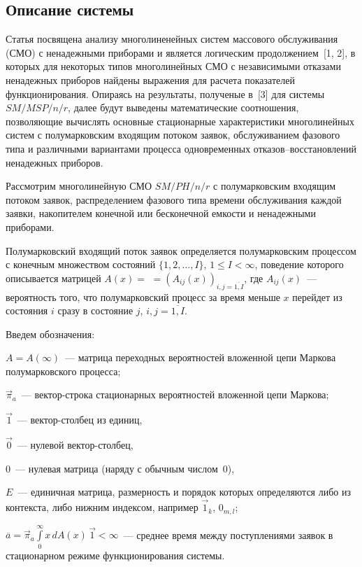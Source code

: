 \begin{multicols}{2}

\section{Описание системы}

Статья посвящена анализу многолиненейных систем массового
обслуживания (СМО) с ненадежными приборами и
является логическим продол\-жением~[1, 2], в которых для некоторых
типов многолинейных СМО с независимыми отказами ненадежных приборов
найдены выражения для расчета показателей функционирования.
Опираясь на результаты, полученые в~[3] для системы $SM/MSP/n/r$,
далее будут выведены математические соотношения, позволяющие вычислять
основные стационарные характеристики многолинейных систем с полумарковским
входящим потоком заявок, обслуживанием фазового типа и различными вариантами
процесса одновременных отказов--восстановлений ненадежных приборов.

Рассмотрим многолинейную СМО $SM/PH/n/r$ с полумарковским входящим
потоком заявок, распределением фазового типа времени обслуживания
каждой заявки, накопителем конечной или бесконечной емкости и
ненадежными приборами.

Полумарковский входящий поток заявок определяется полумарковским процессом с 
конечным множеством состояний $\{1,2,\ldots,I\}$, $1\le I<\infty$, поведение 
которого описывается матрицей $A(x)=$\linebreak 
$=(A_{ij}(x))_{i,j=\overline{1,I}}$, где $A_{ij}(x)$~--- вероятность того, что 
полумарковский процесс за время меньше $x$ пе\-рейдет из состояния $i$ сразу в 
состояние $j$,  $i,j=\overline{1,I}$.

Введем обозначения:\\[-16pt]
\begin{description}
\item $A=A(\infty)$~--- матрица переходных ве\-роятностей вложенной цепи
Маркова полумарковского процесса;
\item $\vec\pi_a$~--- вектор-строка стационарных вероятностей вложенной
цепи Маркова;
\item $\vec1$~--- вектор-столбец из единиц,
\item $\vec0$~--- нулевой вектор-столбец,
\item $0$~--- нулевая матрица (наряду с обычным чис\-лом~0),
\item $E$~--- единичная матрица, размерность и порядок которых
определяются либо из контекста, либо нижним индексом,
например $\vec1_k$, $0_{m,l}$;
\item $\overline a =
\vec\pi_a \int\limits_0^\infty x\, dA(x)\, \vec1
< \infty
$~--- среднее время между поступлениями заявок в стационарном
режиме функционирования системы.
\end{description}


\end{multicols}
